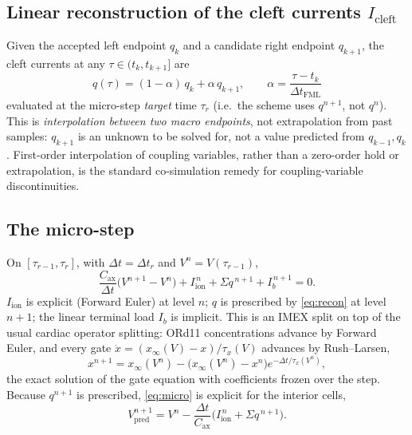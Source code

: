 \documentclass[11pt]{article}
\newcommand{\Icl}{I_{\mathrm{cleft}}}
\newcommand{\Iion}{I_{\mathrm{ion}}}
\newcommand{\Ib}{I_{b}}
\newcommand{\Cax}{C_{\mathrm{ax}}}
\newcommand{\dtF}{\Delta t_{\mathrm{FML}}}
\begin{document}
\subsection{Linear reconstruction of the cleft currents $\Icl$}

Given the accepted left endpoint $q_k$ and a candidate right endpoint
$q_{k+1}$, the cleft currents at any $\tau\in(t_k,t_{k+1}]$ are
\begin{equation}
\boxed{\;
q(\tau)=(1-\alpha)\,q_k+\alpha\,q_{k+1},
\qquad
\alpha=\frac{\tau-t_k}{\dtF}\;}
\label{eq:recon}
\end{equation}
evaluated at the micro-step \emph{target} time $\tau_r$ (i.e.\ the scheme uses
$q^{n+1}$, not $q^n$). This is \emph{interpolation between two macro endpoints},
not extrapolation from past samples: $q_{k+1}$ is an unknown to be solved for,
not a value predicted from $q_{k-1},q_k$. First-order interpolation of coupling
variables, rather than a zero-order hold or extrapolation, is the standard
co-simulation remedy for coupling-variable discontinuities.

\subsection{The micro-step}

On $[\tau_{r-1},\tau_r]$, with $\Delta t=\Delta t_r$ and $V^n=V(\tau_{r-1})$,
\begin{equation}
\frac{\Cax}{\Delta t}\bigl(V^{n+1}-V^{n}\bigr)
+\Iion^{\,n}+\Sigma q^{\,n+1}+\Ib^{\,n+1}=0.
\label{eq:micro}
\end{equation}
$\Iion$ is explicit (Forward Euler) at level $n$; $q$ is prescribed by
\eqref{eq:recon} at level $n+1$; the linear terminal load $\Ib$ is implicit.
This is an IMEX split on top of the usual cardiac operator
splitting: ORd11 concentrations advance by Forward Euler, and
every gate $\dot x=(x_\infty(V)-x)/\tau_x(V)$ advances by Rush--Larsen,
\begin{equation}
x^{n+1}=x_\infty(V^n)-\bigl(x_\infty(V^n)-x^{n}\bigr)e^{-\Delta t/\tau_x(V^n)},
\label{eq:rl}
\end{equation}
the exact solution of the gate equation with coefficients frozen over the step.
Because $q^{n+1}$ is prescribed, \eqref{eq:micro} is explicit for the interior
cells,
\begin{equation}
V^{n+1}_{\mathrm{pred}}=V^{n}-\frac{\Delta t}{\Cax}\bigl(\Iion^{\,n}+\Sigma q^{\,n+1}\bigr).
\label{eq:predictor}
\end{equation}
\end{document}
